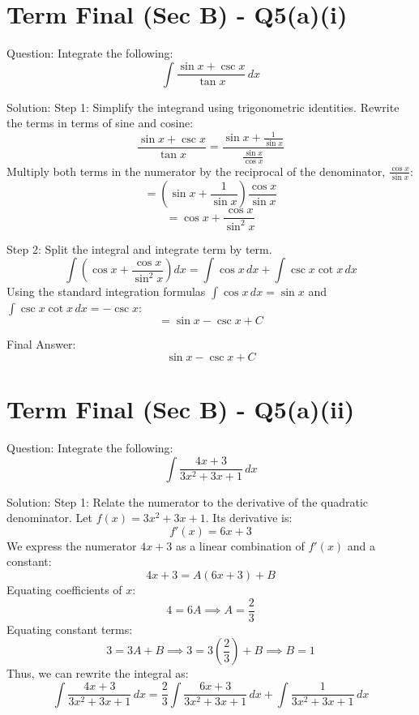\documentclass{article}
\begin{document}
\section*{Term Final (Sec B) - Q5(a)(i)}
Question:
Integrate the following:
\[
\int \frac{\sin x + \csc x}{\tan x} \, dx
\]

Solution:
Step 1: Simplify the integrand using trigonometric identities.
Rewrite the terms in terms of sine and cosine:
\[
\frac{\sin x + \csc x}{\tan x} = \frac{\sin x + \frac{1}{\sin x}}{\frac{\sin x}{\cos x}}
\]
Multiply both terms in the numerator by the reciprocal of the denominator, \(\frac{\cos x}{\sin x}\):
\[
= \left( \sin x + \frac{1}{\sin x} \right) \frac{\cos x}{\sin x}
\]
\[
= \cos x + \frac{\cos x}{\sin^2 x}
\]

Step 2: Split the integral and integrate term by term.
\[
\int \left( \cos x + \frac{\cos x}{\sin^2 x} \right) dx = \int \cos x \, dx + \int \csc x \cot x \, dx
\]
Using the standard integration formulas \(\int \cos x \, dx = \sin x\) and \(\int \csc x \cot x \, dx = -\csc x\):
\[
= \sin x - \csc x + C
\]

Final Answer:
\[
\boxed{\sin x - \csc x + C}
\]

\section*{Term Final (Sec B) - Q5(a)(ii)}
Question:
Integrate the following:
\[
\int \frac{4x+3}{3x^2+3x+1} \, dx
\]

Solution:
Step 1: Relate the numerator to the derivative of the quadratic denominator.
Let \(f(x) = 3x^2 + 3x + 1\). Its derivative is:
\[
f'(x) = 6x + 3
\]
We express the numerator \(4x + 3\) as a linear combination of \(f'(x)\) and a constant:
\[
4x + 3 = A(6x + 3) + B
\]
Equating coefficients of \(x\):
\[
4 = 6A \implies A = \frac{2}{3}
\]
Equating constant terms:
\[
3 = 3A + B \implies 3 = 3\left(\frac{2}{3}\right) + B \implies B = 1
\]
Thus, we can rewrite the integral as:
\[
\int \frac{4x+3}{3x^2+3x+1} \, dx = \frac{2}{3} \int \frac{6x+3}{3x^2+3x+1} \, dx + \int \frac{1}{3x^2+3x+1} \, dx
\]
\end{document}

